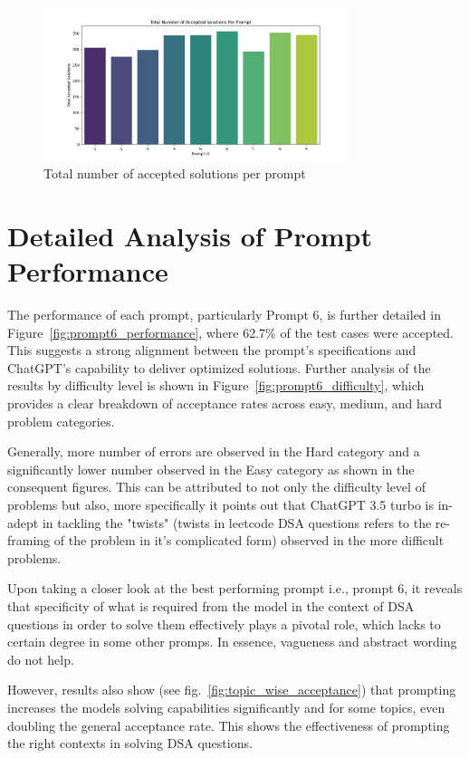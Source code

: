 \begin{figure}[H]
    \centering
    \includegraphics[width=0.8\textwidth]{figures/prompt_acceptance.jpg}
    \caption{Total number of accepted solutions per prompt}
    \label{fig:accepted_solutions}
\end{figure}



\section{Detailed Analysis of Prompt Performance}
The performance of each prompt, particularly Prompt 6, is further detailed in Figure~\ref{fig:prompt6_performance}, where 62.7\% of the test cases were accepted. This suggests a strong alignment between the prompt's specifications and ChatGPT's capability to deliver optimized solutions. Further analysis of the results by difficulty level is shown in Figure~\ref{fig:prompt6_difficulty}, which provides a clear breakdown of acceptance rates across easy, medium, and hard problem categories.

Generally, more number of errors are observed in the Hard category and a significantly lower number observed in the Easy category as shown in the consequent figures. This can be attributed to not only the difficulty level of problems but also, more specifically it points out that ChatGPT 3.5 turbo is in-adept in tackling the "twists" (twists in leetcode DSA questions refers to the re-framing of the problem in it's complicated form) observed in the more difficult problems. 

Upon taking a closer look at the best performing prompt i.e., prompt 6, it reveals that specificity of what is required from the model in the context of DSA questions in order to solve them effectively plays a pivotal role, which lacks to certain degree in some other promps. In essence, vagueness and abstract wording do not help.

However, results also show (see fig.~\ref{fig:topic_wise_acceptance}) that prompting increases the models solving capabilities significantly and for some topics, even doubling the general acceptance rate. This shows the effectiveness of prompting the right contexts in solving DSA questions.

